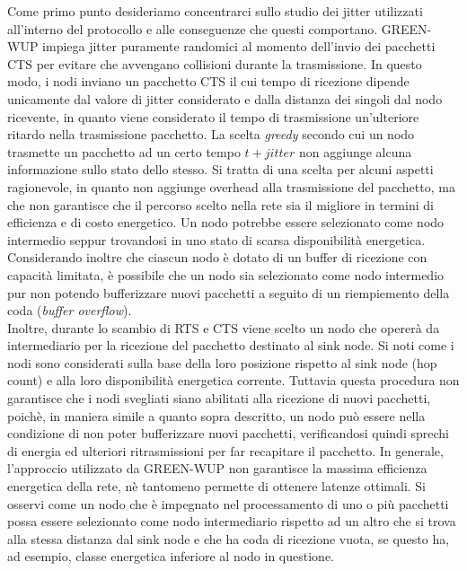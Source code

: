 \documentclass[binding=0.6cm,TFA]{sapthesis}
\begin{document}
Come primo punto desideriamo concentrarci sullo studio dei jitter utilizzati all'interno del protocollo e alle conseguenze che questi comportano.
GREEN-WUP impiega jitter puramente randomici al momento dell'invio dei pacchetti CTS per evitare che avvengano collisioni durante
la trasmissione. In questo modo, i nodi inviano un pacchetto CTS il cui tempo di ricezione dipende unicamente dal valore di jitter
considerato e dalla distanza dei singoli dal nodo ricevente, in quanto viene considerato il tempo di trasmissione un'ulteriore ritardo nella
trasmissione pacchetto. La scelta \emph{greedy} secondo cui un nodo trasmette un pacchetto ad un certo tempo $t+jitter$ non aggiunge alcuna
informazione sullo stato dello stesso. Si tratta di una scelta per alcuni aspetti ragionevole, in quanto non aggiunge overhead alla trasmissione
del pacchetto, ma che non garantisce che il percorso scelto nella rete sia il migliore in termini di efficienza e di costo energetico. Un nodo
potrebbe essere selezionato come nodo intermedio seppur trovandosi in uno stato di scarsa disponibilità energetica. Considerando inoltre che
ciascun nodo è dotato di un buffer di ricezione con capacità limitata, è possibile che un nodo sia selezionato come nodo intermedio pur non
potendo bufferizzare nuovi pacchetti a seguito di un riempiemento della coda (\emph{buffer overflow}).\\

Inoltre, durante lo scambio di RTS e CTS viene scelto un nodo che opererà da intermediario per la ricezione del pacchetto destinato
al sink node. Si noti come i nodi sono considerati sulla base della loro posizione rispetto al sink node (hop count) e alla loro
disponibilità energetica corrente. Tuttavia questa procedura non garantisce che i nodi svegliati siano abilitati alla ricezione di nuovi pacchetti,
poichè, in maniera simile a quanto sopra descritto, un nodo può essere nella condizione di non poter bufferizzare nuovi pacchetti, verificandosi
quindi sprechi di energia ed ulteriori ritrasmissioni per far recapitare il pacchetto. In generale, l'approccio utilizzato da GREEN-WUP non garantisce
la massima efficienza energetica della rete, nè tantomeno permette di ottenere latenze ottimali. Si osservi come un nodo che è impegnato
nel processamento di uno o più pacchetti possa essere selezionato come nodo intermediario rispetto ad un altro che si trova alla stessa distanza
dal sink node e che ha coda di ricezione vuota, se questo ha, ad esempio, classe energetica inferiore al nodo in questione. \\
\end{document}
